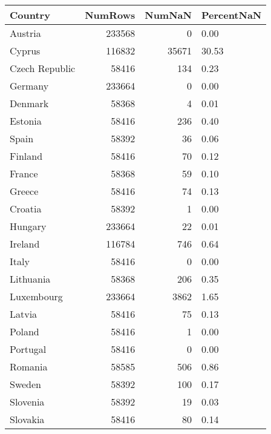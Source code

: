 \begin{tabular}{lrrl}
\toprule
Country & NumRows & NumNaN & PercentNaN \\
\midrule
Austria & 233568 & 0 & 0.00 \\
Cyprus & 116832 & 35671 & 30.53 \\
Czech Republic & 58416 & 134 & 0.23 \\
Germany & 233664 & 0 & 0.00 \\
Denmark & 58368 & 4 & 0.01 \\
Estonia & 58416 & 236 & 0.40 \\
Spain & 58392 & 36 & 0.06 \\
Finland & 58416 & 70 & 0.12 \\
France & 58368 & 59 & 0.10 \\
Greece & 58416 & 74 & 0.13 \\
Croatia & 58392 & 1 & 0.00 \\
Hungary & 233664 & 22 & 0.01 \\
Ireland & 116784 & 746 & 0.64 \\
Italy & 58416 & 0 & 0.00 \\
Lithuania & 58368 & 206 & 0.35 \\
Luxembourg & 233664 & 3862 & 1.65 \\
Latvia & 58416 & 75 & 0.13 \\
Poland & 58416 & 1 & 0.00 \\
Portugal & 58416 & 0 & 0.00 \\
Romania & 58585 & 506 & 0.86 \\
Sweden & 58392 & 100 & 0.17 \\
Slovenia & 58392 & 19 & 0.03 \\
Slovakia & 58416 & 80 & 0.14 \\
\bottomrule
\end{tabular}
